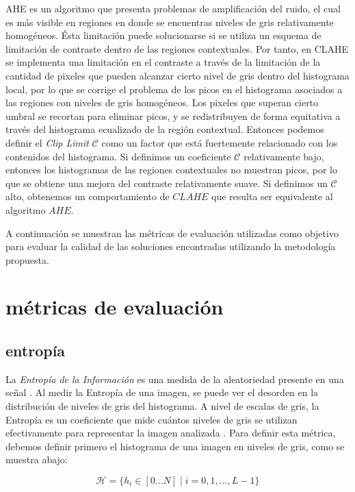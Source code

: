 \documentclass[spanish,twocolumn]{article}
\begin{document}
AHE es un algoritmo que presenta problemas de amplificación del ruido, el cual es más visible en regiones en donde se encuentras niveles de gris relativamente homogéneos. Ésta limitación puede solucionarse si se utiliza un esquema de limitación de contraste dentro de las regiones contextuales. Por tanto, en CLAHE se implementa una limitación en el contraste a través de la limitación de la cantidad de pixeles que pueden alcanzar cierto nivel de gris dentro del histograma local, por lo que se corrige el problema de los picos en el histograma asociados a las regiones con niveles de gris homogéneos. Los pixeles que superan cierto umbral se recortan para eliminar picos, y se redistribuyen de forma equitativa a través del histograma ecualizado de la región contextual. Entonces podemos definir el {\it Clip Limit} $\mathcal{C}$ como un factor que está fuertemente relacionado con los contenidos del histograma. Si definimos un coeficiente $\mathcal{C}$ relativamente bajo, entonces los histogramas de las regiones contextuales no muestran picos, por lo que se obtiene una mejora del contraste relativamente suave. Si definimos un $\mathcal{C}$ alto, obtenemos un comportamiento de $CLAHE$ que resulta ser equivalente al algoritmo $AHE$.

A continuación se muestran las métricas de evaluación utilizadas como objetivo para evaluar la calidad de las soluciones encontradas utilizando la metodología propuesta.

\section{métricas de evaluación}
\label{sec:metricas}

\subsection{entropía}
\label{ssec:entropia}

La {\it Entropía de la Información} es una medida de la aleatoriedad presente en una señal \cite{tsai2008information}. Al medir la Entropía de una imagen, se puede ver el desorden en la distribución de niveles de gris del histograma. A nivel de escalas de gris, la Entropía es un coeficiente que mide cuántos niveles de gris se utilizan efectivamente para representar la imagen analizada \cite{kwok2006intensity}. Para definir esta métrica, debemos definir primero el histograma de una imagen en niveles de gris, como se muestra abajo: 

\begin{equation}\label{eq:histograma}
    \mathcal{H}=\{h_i \in [0...N]\mid i=0,1,...,L-1\}
\end{equation}
\end{document}
